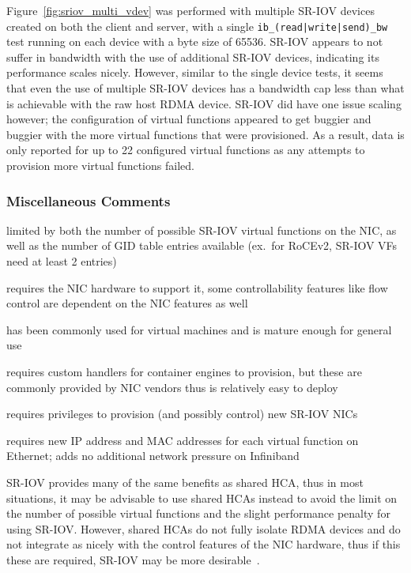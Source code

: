 \documentclass[12pt,titlepage]{article}
\begin{document}
Figure~\ref{fig:sriov_multi_vdev} was performed with multiple SR-IOV devices created on both the client and server, with a single \texttt{ib\_(read|write|send)\_bw} test running on each device with a byte size of 65536.
SR-IOV appears to not suffer in bandwidth with the use of additional SR-IOV devices, indicating its performance scales nicely.
However, similar to the single device tests, it seems that even the use of multiple SR-IOV devices has a bandwidth cap less than what is achievable with the raw host RDMA device.
SR-IOV did have one issue scaling however; 
the configuration of virtual functions appeared to get buggier and buggier with the more virtual functions that were provisioned.
As a result, data is only reported for up to 22 configured virtual functions as any attempts to provision more virtual functions failed. 

\subsubsection*{Miscellaneous Comments}
\begin{description}[nolistsep,font={{\scshape\bfseries}}]
	\item[Scalability Limits] limited by both the number of possible SR-IOV virtual functions on the NIC, as well as the number of GID table entries available (ex.\ for RoCEv2, SR-IOV VFs need at least 2 entries)
	\item[Proprietary] requires the NIC hardware to support it, some controllability features like flow control are dependent on the NIC features as well
	\item[Maturity] has been commonly used for virtual machines and is mature enough for general use
	\item[Ease in Deployment] requires custom handlers for container engines to provision, but these are commonly provided by NIC vendors thus is relatively easy to deploy
	\item[Execution Privileges] requires privileges to provision (and possibly control) new SR-IOV NICs
	\item[Network Pressure] requires new IP address and MAC addresses for each virtual function on Ethernet; adds no additional network pressure on Infiniband
\end{description}

SR-IOV provides many of the same benefits as shared HCA, thus in most situations, it may be advisable to use shared HCAs instead to avoid the limit on the number of possible virtual functions and the slight performance penalty for using SR-IOV\@.
However, shared HCAs do not fully isolate RDMA devices and do not integrate as nicely with the control features of the NIC hardware, thus if this these are required, SR-IOV may be more desirable~\cite{mlnxofedmanual,mellanoxdockersriov}.
\end{document}
